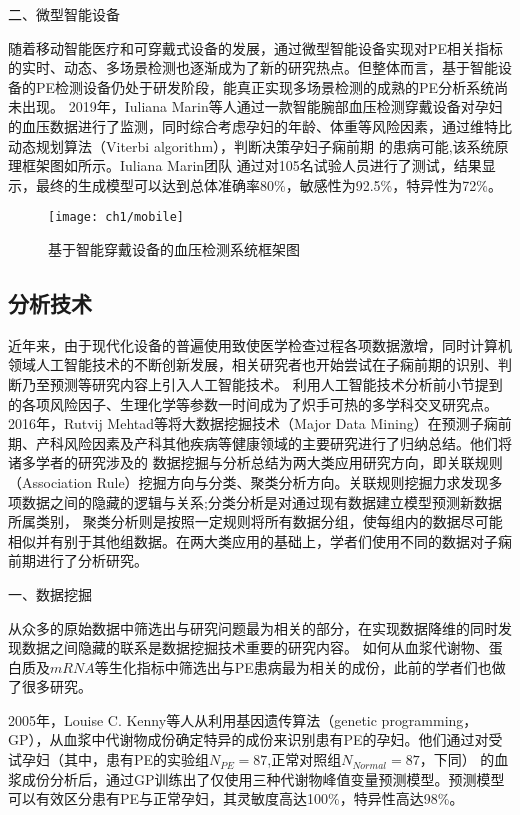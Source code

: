 二、微型智能设备

随着移动智能医疗和可穿戴式设备的发展，通过微型智能设备实现对PE相关指标的实时、动态、多场景检测也逐渐成为了新的研究热点。但整体而言，基于智能设备的PE检测设备仍处于研发阶段，能真正实现多场景检测的成熟的PE分析系统尚未出现。
2019年，Iuliana Marin等人\cite{Marin2019,Marin2020}通过一款智能腕部血压检测穿戴设备对孕妇的血压数据进行了监测，同时综合考虑孕妇的年龄、体重等风险因素，通过维特比动态规划算法（Viterbi algorithm），判断决策孕妇子痫前期
的患病可能,该系统原理框架图如所示。Iuliana Marin团队
通过对105名试验人员进行了测试，结果显示，最终的生成模型可以达到总体准确率80\%，敏感性为92.5\%，特异性为72\%\cite{Marin2019}。
\begin{figure}[htbp]
    \centering
    \texttt{[image: ch1/mobile]}
    \caption{\label{fig:mobile}基于智能穿戴设备的血压检测系统框架图}
\end{figure}

\subsection{分析技术}
近年来，由于现代化设备的普遍使用致使医学检查过程各项数据激增，同时计算机领域人工智能技术的不断创新发展，相关研究者也开始尝试在子痫前期的识别、判断乃至预测等研究内容上引入人工智能技术。
利用人工智能技术分析前小节提到的各项风险因子、生理化学等参数一时间成为了炽手可热的多学科交叉研究点。
2016年，Rutvij Mehtad等\cite{Mehta2016}将大数据挖掘技术（Major Data Mining）在预测子痫前期、产科风险因素及产科其他疾病等健康领域的主要研究进行了归纳总结。他们将诸多学者的研究涉及的
数据挖掘与分析总结为两大类应用研究方向，即关联规则（Association Rule）挖掘方向与分类、聚类分析方向。关联规则挖掘力求发现多项数据之间的隐藏的逻辑与关系;分类分析是对通过现有数据建立模型预测新数据所属类别，
聚类分析则是按照一定规则将所有数据分组，使每组内的数据尽可能相似并有别于其他组数据\cite{Han2006}。在两大类应用的基础上，学者们使用不同的数据对子痫前期进行了分析研究。

一、数据挖掘

从众多的原始数据中筛选出与研究问题最为相关的部分，在实现数据降维的同时发现数据之间隐藏的联系是数据挖掘技术重要的研究内容。
如何从血浆代谢物、蛋白质及$mRNA$等生化指标中筛选出与PE患病最为相关的成份，此前的学者们也做了很多研究。

2005年，Louise C. Kenny等人\cite{Kenny2005}从利用基因遗传算法（genetic programming，GP），从血浆中代谢物成份确定特异的成份来识别患有PE的孕妇。他们通过对受试孕妇（其中，患有PE的实验组$N_{PE}=87$,正常对照组$N_{Normal}=87$，下同）
的血浆成份分析后，通过GP训练出了仅使用三种代谢物峰值变量预测模型。预测模型可以有效区分患有PE与正常孕妇，其灵敏度高达100\%，特异性高达98\%。

